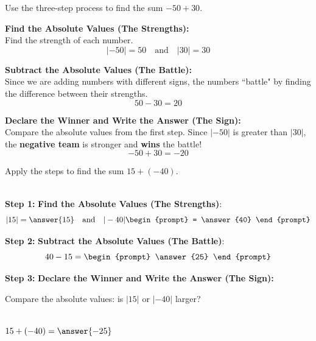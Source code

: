 \documentclass{ximera}[font=12pt]
\begin{document}
\begin{example} 
    
    Use the three-step process to find the sum $-50 + 30.$

    \begin{explanation}
    \begin{description}[style=multiline, leftmargin=5em, font=\bfseries]
        \item[Step 1] \textbf{Find the Absolute Values (The Strengths):} \\
        Find the strength of each number.
        \[ |-50| = 50 \quad \text{and} \quad |30| = 30 \]

        \item[Step 2] \textbf{Subtract the Absolute Values (The Battle):} \\
        Since we are adding numbers with different signs, the numbers ``battle" by finding the difference between their strengths.
        \[ 50 - 30 = 20 \]

        \item[Step 3] \textbf{Declare the Winner and Write the Answer (The Sign):} \\
        Compare the absolute values from the first step. Since $|-50|$ is greater than $|30|,$ the \textbf{negative team}
        is stronger and \textbf{wins} the battle!  
        \[ -50 + 30 = -20 \]
\end{description}
\end{explanation}
\end{example}


\bigskip

\begin{problem}
    Apply the steps to find the sum $15 + (-40).$

    ~ \\[1em]

    \textbf{Step 1:} \textbf{Find the Absolute Values (The Strengths)}:
    \[ |15| = \answer{15} \quad \text{and} \quad |-40| \begin{prompt}  = \answer{40} \end{prompt} \]

    
    \textbf{Step 2:} \textbf{Subtract the Absolute Values (The Battle)}:
    \[ 40 - 15 = \begin{prompt} \answer{25} \end{prompt} \]


    \textbf{Step 3:} \textbf{Declare the Winner and Write the Answer (The Sign):}

    Compare the absolute values: is $|15|$ or $|-40|$ larger?
    
    \begin{multipleChoice}
    \end{multipleChoice}

    ~ \\[2em]

     $15 + (-40) = \answer{-25}$

\end{problem}
\end{document}
